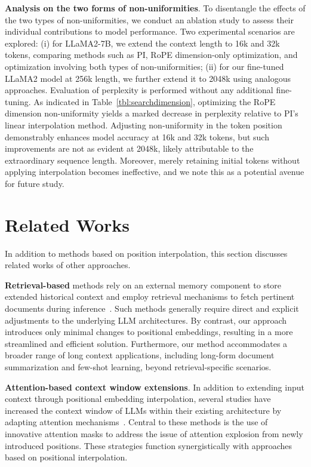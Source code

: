 \textbf{Analysis on the two forms of non-uniformities}. To disentangle the effects of the two types of non-uniformities, we conduct an ablation study to assess their individual contributions to model performance. Two experimental scenarios are explored: (i) for LLaMA2-7B, we extend the context length to 16k and 32k tokens, comparing methods such as PI, RoPE dimension-only optimization, and optimization involving both types of non-uniformities; (ii) for our fine-tuned LLaMA2 model at 256k length, we further extend it to 2048k using analogous approaches. Evaluation of perplexity is performed without any additional fine-tuning. As indicated in Table~\ref{tbl:searchdimension}, optimizing the RoPE dimension non-uniformity yields a marked decrease in perplexity relative to PI's linear interpolation method. Adjusting non-uniformity in the token position demonstrably enhances model accuracy at 16k and 32k tokens, but such improvements are not as evident at 2048k, likely attributable to the extraordinary sequence length. Moreover, merely retaining initial tokens without applying interpolation becomes ineffective, and we note this as a potential avenue for future study.

\section{Related Works}

In addition to methods based on position interpolation, this section discusses related works of other approaches. 

\textbf{Retrieval-based} methods rely on an external memory component to store extended historical context and employ retrieval mechanisms to fetch pertinent documents during inference~\cite{longllama,wang2023augmenting,borgeaud2022improving}. Such methods generally require direct and explicit adjustments to the underlying LLM architectures. By contrast, our approach introduces only minimal changes to positional embeddings, resulting in a more streamlined and efficient solution. Furthermore, our method accommodates a broader range of long context applications, including long-form document summarization and few-shot learning, beyond retrieval-specific scenarios.

\textbf{Attention-based context window extensions}. In addition to extending input context through positional embedding interpolation, several studies have increased the context window of LLMs within their existing architecture by adapting attention mechanisms~\cite{han2023lminfinite, streamingllm,parallelwindow}. Central to these methods is the use of innovative attention masks to address the issue of attention explosion from newly introduced positions. These strategies function synergistically with approaches based on positional interpolation.

